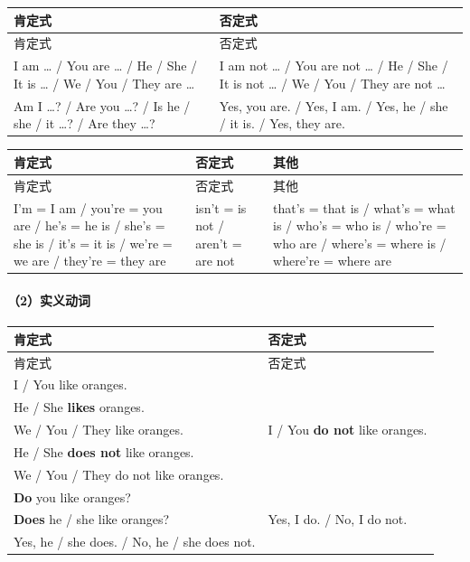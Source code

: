 \documentclass[11pt,a4paper]{ctexart}
\begin{document}
{\footnotesize
\begin{longtable}{p{6.70cm}p{6.70cm}}
\hline
肯定式 & 否定式 \\
\hline
\endfirsthead
\hline
肯定式 & 否定式 \\
\hline
\endhead
\hline
\endfoot
I am … / You are … / He / She / It is … / We / You / They are … & I am not … / You are not … / He / She / It is not … / We / You / They are not … \\
Am I …? / Are you …? / Is he / she / it …? / Are they …? & Yes, you are. / Yes, I am. / Yes, he / she / it is. / Yes, they are. \\
\end{longtable}
}

{\footnotesize
\begin{longtable}{p{4.47cm}p{4.47cm}p{4.47cm}}
\hline
肯定式 & 否定式 & 其他 \\
\hline
\endfirsthead
\hline
肯定式 & 否定式 & 其他 \\
\hline
\endhead
\hline
\endfoot
I’m = I am / you’re = you are / he’s = he is / she’s = she is / it’s = it is / we’re = we are / they’re = they are & isn’t = is not / aren’t = are not & that’s = that is / what’s = what is / who’s = who is / who’re = who are / where’s = where is / where’re = where are \\
\end{longtable}
}

\paragraph{（2）实义动词}

{\footnotesize
\begin{longtable}{p{6.70cm}p{6.70cm}}
\hline
肯定式 & 否定式 \\
\hline
\endfirsthead
\hline
肯定式 & 否定式 \\
\hline
\endhead
\hline
\endfoot
I / You like oranges.\\ He / She \textbf{likes} oranges.\\ We / You / They like oranges. & I / You \textbf{do not} like oranges.\\ He / She \textbf{does not} like oranges.\\ We / You / They do not like oranges. \\
\textbf{Do} you like oranges?\\ \textbf{Does} he / she like oranges? & Yes, I do. / No, I do not.\\ Yes, he / she does. / No, he / she does not. \\
\end{longtable}
}
\end{document}
